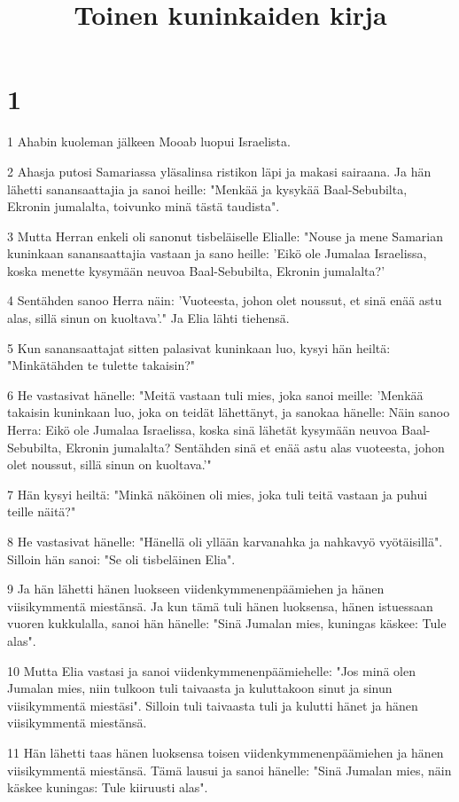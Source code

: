 

\title{Toinen kuninkaiden kirja}


\chapter{1}

\par 1 Ahabin kuoleman jälkeen Mooab luopui Israelista.
\par 2 Ahasja putosi Samariassa yläsalinsa ristikon läpi ja makasi sairaana. Ja hän lähetti sanansaattajia ja sanoi heille: "Menkää ja kysykää Baal-Sebubilta, Ekronin jumalalta, toivunko minä tästä taudista".
\par 3 Mutta Herran enkeli oli sanonut tisbeläiselle Elialle: "Nouse ja mene Samarian kuninkaan sanansaattajia vastaan ja sano heille: 'Eikö ole Jumalaa Israelissa, koska menette kysymään neuvoa Baal-Sebubilta, Ekronin jumalalta?'
\par 4 Sentähden sanoo Herra näin: 'Vuoteesta, johon olet noussut, et sinä enää astu alas, sillä sinun on kuoltava'." Ja Elia lähti tiehensä.
\par 5 Kun sanansaattajat sitten palasivat kuninkaan luo, kysyi hän heiltä: "Minkätähden te tulette takaisin?"
\par 6 He vastasivat hänelle: "Meitä vastaan tuli mies, joka sanoi meille: 'Menkää takaisin kuninkaan luo, joka on teidät lähettänyt, ja sanokaa hänelle: Näin sanoo Herra: Eikö ole Jumalaa Israelissa, koska sinä lähetät kysymään neuvoa Baal-Sebubilta, Ekronin jumalalta? Sentähden sinä et enää astu alas vuoteesta, johon olet noussut, sillä sinun on kuoltava.'"
\par 7 Hän kysyi heiltä: "Minkä näköinen oli mies, joka tuli teitä vastaan ja puhui teille näitä?"
\par 8 He vastasivat hänelle: "Hänellä oli yllään karvanahka ja nahkavyö vyötäisillä". Silloin hän sanoi: "Se oli tisbeläinen Elia".
\par 9 Ja hän lähetti hänen luokseen viidenkymmenenpäämiehen ja hänen viisikymmentä miestänsä. Ja kun tämä tuli hänen luoksensa, hänen istuessaan vuoren kukkulalla, sanoi hän hänelle: "Sinä Jumalan mies, kuningas käskee: Tule alas".
\par 10 Mutta Elia vastasi ja sanoi viidenkymmenenpäämiehelle: "Jos minä olen Jumalan mies, niin tulkoon tuli taivaasta ja kuluttakoon sinut ja sinun viisikymmentä miestäsi". Silloin tuli taivaasta tuli ja kulutti hänet ja hänen viisikymmentä miestänsä.
\par 11 Hän lähetti taas hänen luoksensa toisen viidenkymmenenpäämiehen ja hänen viisikymmentä miestänsä. Tämä lausui ja sanoi hänelle: "Sinä Jumalan mies, näin käskee kuningas: Tule kiiruusti alas".
